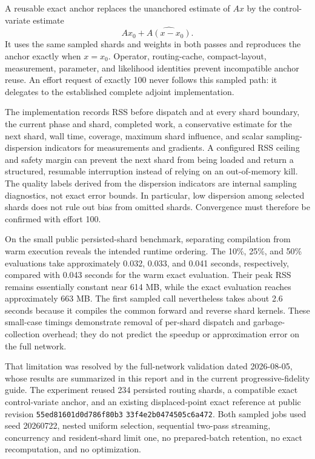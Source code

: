 A reusable exact anchor replaces the unanchored estimate of $A x$ by the
control-variate estimate
\[
  A x_0 + \widehat{A(x-x_0)}.
\]
It uses the same sampled shards and weights in both passes and reproduces the
anchor exactly when $x=x_0$.  Operator, routing-cache, compact-layout,
measurement, parameter, and likelihood identities prevent incompatible anchor
reuse.  An effort request of exactly 100 never follows this sampled path: it
delegates to the established complete adjoint implementation.

The implementation records RSS before dispatch and at every shard boundary,
the current phase and shard, completed work, a conservative estimate for the
next shard, wall time, coverage, maximum shard influence, and scalar sampling-
dispersion indicators for measurements and gradients.  A configured RSS
ceiling and safety margin can prevent the next shard from being loaded and
return a structured, resumable interruption instead of relying on an
out-of-memory kill.  The quality labels derived from the dispersion indicators
are internal sampling diagnostics, not exact error bounds.  In particular,
low dispersion among selected shards does not rule out bias from omitted
shards.  Convergence must therefore be confirmed with effort 100.

On the small public persisted-shard benchmark, separating compilation from
warm execution reveals the intended runtime ordering.  The 10\%, 25\%, and
50\% evaluations take approximately 0.032, 0.033, and 0.041 seconds,
respectively, compared with 0.043 seconds for the warm exact evaluation.  Their
peak RSS remains essentially constant near 614 MB, while the exact evaluation
reaches approximately 663 MB.  The first sampled call nevertheless takes about
2.6 seconds because it compiles the common forward and reverse shard kernels.
These small-case timings demonstrate removal of per-shard dispatch and garbage-
collection overhead; they do not predict the speedup or approximation error on
the full network.

That limitation was resolved by the full-network validation dated 2026-08-05,
whose results are summarized in this report and in the current
progressive-fidelity guide.
The experiment reused 234 persisted routing shards, a compatible exact
control-variate anchor, and an existing displaced-point exact reference at
public revision
\texttt{55ed81601d0d786f80b3}\allowbreak
\texttt{33f4e2b0474505c6a472}.  Both sampled jobs used
seed 20260722, nested uniform selection, sequential two-pass streaming,
concurrency and resident-shard limit one, no prepared-batch retention, no exact
recomputation, and no optimization.

